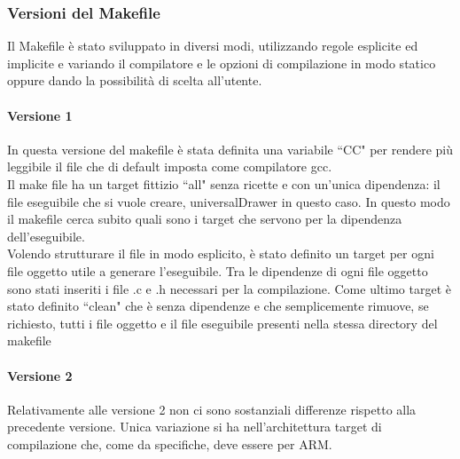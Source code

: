 \documentclass{article}
\begin{document}
	\subsubsection*{Versioni del Makefile}
		Il Makefile è stato sviluppato in diversi modi, utilizzando regole esplicite ed implicite e variando il compilatore
		e le opzioni di compilazione in modo statico oppure dando la possibilità di scelta all'utente.
		\paragraph*{Versione 1}
		In questa versione del makefile è stata definita una variabile ``CC" per rendere più leggibile il file che di default imposta come compilatore gcc. \\
		Il make file ha un target fittizio ``all" senza ricette e con un'unica dipendenza: il file eseguibile che si vuole creare, universalDrawer in questo caso.
                In questo modo il makefile cerca subito quali sono i target che servono per la dipendenza dell'eseguibile. \\
		Volendo strutturare il file in modo esplicito, è stato definito un target per ogni file oggetto utile a generare l'eseguibile.
                Tra le dipendenze di ogni file oggetto sono stati inseriti i file .c e .h necessari per la compilazione.
		Come ultimo target è stato definito ``clean" che è senza dipendenze e che semplicemente rimuove, se richiesto, tutti i file oggetto e il file eseguibile presenti nella stessa directory del makefile 
		\paragraph*{Versione 2}
		Relativamente alle versione 2 non ci sono sostanziali differenze rispetto alla precedente versione. Unica variazione si ha nell'architettura target di compilazione che, come da specifiche, deve essere per ARM.
\end{document}

